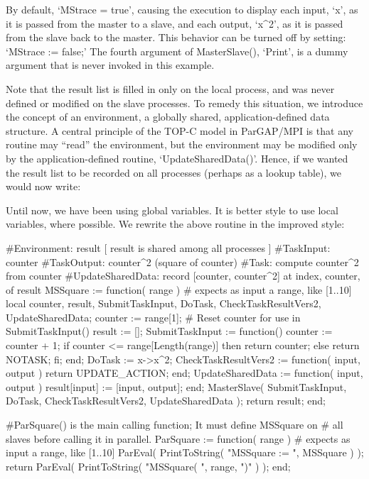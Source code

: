 By default, `MStrace = true', causing the execution to display each
input, `x', as it is passed from the master to a slave, and each output,
`x^2', as it is passed from the slave back to the master.  This behavior
can be turned off by setting: `MStrace := false;'
The fourth argument of
MasterSlave(), `Print', is a dummy argument that is never invoked
in this example.

Note that the result list is filled in only on the local process, and
was never defined or modified on the slave processes.  To remedy this
situation, we introduce the concept of an environment, a globally
shared, application-defined data structure.  A central principle of
the TOP-C model in ParGAP/MPI is that any routine may ``read'' the
environment, but the environment may be modified only by the
application-defined routine, `UpdateSharedData()'.
Hence, if we wanted the result list to be recorded on all processes
(perhaps as a lookup table), we would now write:


Until now, we have been using global variables.  It is better style to
use local variables, where possible.  We rewrite the above routine in
the improved style:

\beginexample
#Environment: result [ result is shared among all processes ]
#TaskInput:   counter
#TaskOutput:  counter^2 (square of counter)
#Task:        compute counter^2 from counter
#UpdateSharedData:  record [counter, counter^2] at index, counter, of result
MSSquare := function( range ) # expects as input a range, like [1..10]
  local counter, result,
      SubmitTaskInput, DoTask, CheckTaskResultVers2, UpdateSharedData;
  counter := range[1]; # Reset counter for use in SubmitTaskInput()
  result := [];
  SubmitTaskInput := function()
    counter := counter + 1;
    if counter <= range[Length(range)] then return counter;
    else return NOTASK;
    fi;
  end;
  DoTask := x->x^2;
  CheckTaskResultVers2 := function( input, output )
    return UPDATE_ACTION;
  end;
  UpdateSharedData := function( input, output )
    result[input] := [input, output];
  end;
  MasterSlave( SubmitTaskInput, DoTask, CheckTaskResultVers2, UpdateSharedData );
  return result;
end;

#ParSquare() is the main calling function;  It must define MSSquare on
#  all slaves before calling it in parallel.
ParSquare := function( range ) # expects as input a range, like [1..10]
  ParEval( PrintToString( "MSSquare := ", MSSquare ) );
  return ParEval( PrintToString( "MSSquare( ", range, ")" ) );
end;
\endexample

